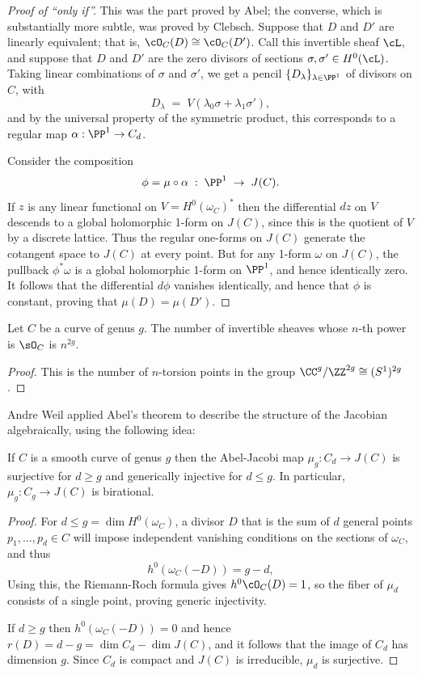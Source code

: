 \begin{proof}[Proof of ``only if'']
This was the part proved by Abel; the converse, which is substantially more subtle, was proved by Clebsch. Suppose that $D$ and $D'$ are linearly equivalent; that is, $\cO_C(D) \cong \cO_C(D')$. Call this invertible sheaf $\cL$, and suppose that $D$ and $D'$ are the zero divisors of sections $\sigma, \sigma' \in H^0(\cL)$.
Taking linear combinations of $\sigma$ and $\sigma'$, we get a pencil $\{D_\lambda\}_{\lambda \in \PP^1}$ of divisors on $C$, with
$$
D_\lambda \; = \; V(\lambda_0\sigma + \lambda_1\sigma'),
$$
and by the universal property of the symmetric product, this corresponds to a regular map $\alpha : \PP^1 \to C_d$. 

Consider the composition
$$
\phi = \mu \circ \alpha \; : \; \PP^1 \; \to \; J(C).
$$
 If $z$ is any linear functional on $V = H^0(\omega_C)^*$ then the differential $dz$  on $V$ descends to a global holomorphic 1-form on
 $J(C)$, since this is the quotient of $V$ by a discrete lattice. Thus the regular one-forms on $J(C)$ generate the cotangent space to $J(C)$ at every point. But for any 1-form $\omega$ on $J(C)$, the pullback $\phi^*\omega$ is a global holomorphic 1-form on $\PP^1$, and hence identically zero. It follows that the differential $d\phi$ vanishes identically, and hence that $\phi$ is constant, proving that $\mu(D) = \mu(D')$.
\end{proof}

\begin{corollary}
Let $C$ be a curve of genus $g$. The number of invertible sheaves whose $n$-th power is $\sO_C$ is $n^{2g}$.
\end{corollary}
\begin{proof}
 This is the number of $n$-torsion points in the group $\CC^g/\ZZ^{2g} \cong (S^1)^{2g}$.
\end{proof}

Andre Weil applied Abel's theorem to describe the structure of the Jacobian algebraically, using the following idea:

\begin{corollary}
If $C$ is a smooth curve of genus $g$ then the Abel-Jacobi map $\mu_g: C_d \to J(C)$ is  surjective for $d\geq g$ and generically injective for $d\leq g$. In particular, $\mu_g:C_g \to J(C)$ is birational. \end{corollary}

\begin{proof}
For $d\leq g = \dim H^{0}(\omega_{C})$,  a divisor $D$ that is the sum of $d$ general points $p_{1}, \dots,  p_{d} \in C$ will impose independent vanishing conditions on the sections of $\omega_{C}$, and thus
$$
h^0(\omega_C(-D)) = g-d,
$$
 Using this, the Riemann-Roch formula gives $h^{0}\cO_{C}(D) = 1$, so the fiber of 
$\mu_{d}$ consists of a single point, proving generic injectivity.

If $d \geq g$ then $h^0(\omega_C(-D)) = 0$ and hence $r(D) = d-g= \dim C_{d} - \dim J(C)$, and it follows that the image of $C_d$ has dimension $g$. Since $C_d$ is compact and $J(C)$ is irreducible, $\mu_{d}$ is surjective.
\end{proof}

